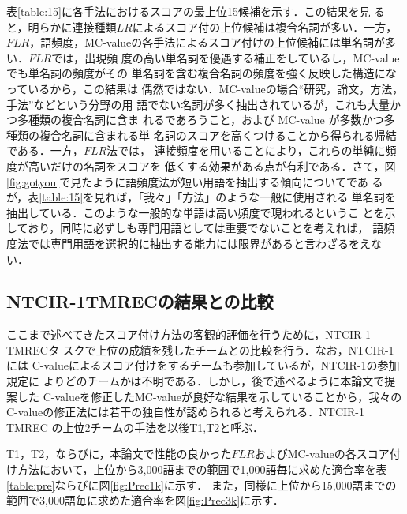 表\ref{table:15}に各手法におけるスコアの最上位15候補を示す．この結果を見
ると，明らかに連接種類$LR$によるスコア付の上位候補は複合名詞が多い．一方，
$FLR$，語頻度，MC-valueの各手法によるスコア付けの上位候補には単名詞が多い．$FLR$では，出現頻
度の高い単名詞を優遇する補正をしているし，MC-valueでも単名詞の頻度がその
単名詞を含む複合名詞の頻度を強く反映した構造になっているから，この結果は
偶然ではない．MC-valueの場合``研究，論文，方法，手法''などという分野の用
語でない名詞が多く抽出されているが，これも大量かつ多種類の複合名詞に含ま
れるであろうこと，および MC-value が多数かつ多種類の複合名詞に含まれる単
名詞のスコアを高くつけることから得られる帰結である．一方，$FLR$法では，
連接頻度を用いることにより，これらの単純に頻度が高いだけの名詞をスコアを
低くする効果がある点が有利である．さて，図
\ref{fig:gotyou}で見たように語頻度法が短い用語を抽出する傾向についてであ
るが，表\ref{table:15}を見れば，「我々」「方法」のような一般に使用される
単名詞を抽出している．このような一般的な単語は高い頻度で現われるというこ
とを示しており，同時に必ずしも専門用語としては重要でないことを考えれば，
語頻度法では専門用語を選択的に抽出する能力には限界があると言わざるをえな
い．

\subsection{NTCIR-1TMRECの結果との比較}

ここまで述べてきたスコア付け方法の客観的評価を行うために，NTCIR-1 TMRECタ
スクで上位の成績を残したチームとの比較を行う．なお，NTCIR-1 には
C-valueによるスコア付けをするチームも参加しているが，NTCIR-1の参加規定に
よりどのチームかは不明である．しかし，後で述べるように本論文で提案した
C-valueを修正したMC-valueが良好な結果を示していることから，我々の
C-valueの修正法には若干の独自性が認められると考えられる．NTCIR-1 TMREC 
の上位2チームの手法を以後T1,T2と呼ぶ．

T1，T2，ならびに，本論文で性能の良かった$FLR$およびMC-valueの各スコア付け方法において，上位から3,000語までの範囲で1,000語毎に求めた適合率を表\ref{table:pre}ならびに図\ref{fig:Prec1k}に示す．
また，同様に上位から15,000語までの範囲で3,000語毎に求めた適合率を図\ref{fig:Prec3k}に示す．

